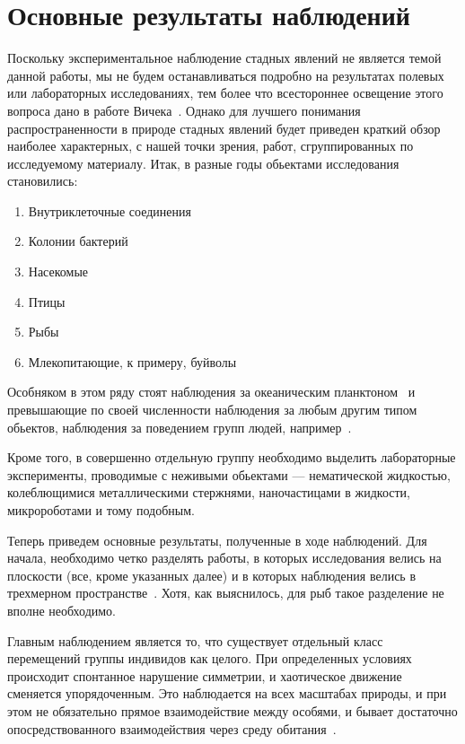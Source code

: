 \section{Основные результаты наблюдений} %
\label{sec:ObservationResults}
	Поскольку экспериментальное наблюдение стадных явлений не является темой данной работы, мы не будем останавливаться подробно на результатах полевых или лабораторных исследованиях, тем более что всестороннее освещение этого вопроса дано в работе Вичека~\cite{vicsek2012}. Однако для лучшего понимания распространенности в природе стадных явлений будет приведен краткий обзор наиболее характерных, с нашей точки зрения, работ, сгруппированных по исследуемому материалу. Итак, в разные годы обьектами исследования становились:
	\begin{enumerate}
		\item Внутриклеточные соединения~\cite{chowdhury2006,keller1971}
		\item Колонии бактерий~\cite{czirok1998,csahok1997}
		\item Насекомые~\cite{buhl2006}
		\item Птицы~\cite{ballerini2008,selous1931,dellariccia2008,biro2006,major1978,nagy2010}
		\item Рыбы~\cite{cambui2012,makris2009,parrish1997}
		\item Млекопитающие, к примеру, буйволы~\cite{sinclair1977}
	\end{enumerate}
	Особняком в этом ряду стоят наблюдения за океаническим планктоном~\cite{seuront2004} и превышающие по своей численности наблюдения за любым другим типом обьектов, наблюдения за поведением групп людей, например~\cite{parisi2009,moussaid2011}.

	Кроме того, в совершенно отдельную группу необходимо выделить лабораторные эксперименты, проводимые с неживыми обьектами --- нематической жидкостью, колеблющимися металлическими стержнями, наночастицами в жидкости, микророботами и тому подобным.~\cite{schaller2010,turgut2008,blair2003}

	Теперь приведем основные результаты, полученные в ходе наблюдений. Для начала, необходимо четко разделять работы, в которых исследования велись на плоскости (все, кроме указанных далее) и в которых наблюдения велись в трехмерном пространстве~\cite{cullen1965,ballerini2008,major1978,makris2009}. Хотя, как выяснилось, для рыб такое разделение не вполне необходимо.

	Главным наблюдением является то, что существует отдельный класс перемещений группы индивидов как целого. При определенных условиях происходит спонтанное нарушение симметрии, и хаотическое движение сменяется упорядоченным. Это наблюдается на всех масштабах природы, и при этом не обязательно прямое взаимодействие между особями, и бывает достаточно опосредствованного взаимодействия через среду обитания~\cite[с. 119]{vicsek2012}. 

